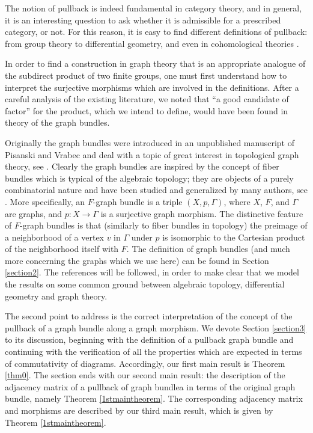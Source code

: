 \documentclass{amsart}
\theoremstyle{definition}
\numberwithin{equation}{section}
\begin{document}
The notion of  pullback is indeed  fundamental  in category theory, and in general, it is an interesting question to ask whether it is admissible for a prescribed category, or not. For this reason, it is easy to find different definitions of pullback: from group theory to differential geometry, and even in cohomological theories \cite{stefano}.


In order to find a construction in graph theory that is an appropriate analogue of the subdirect product of two finite groups, one must first understand how to interpret the surjective morphisms which are involved in the definitions. After a careful analysis of the existing literature, we noted that ``a good candidate of factor'' for the product, which we intend to define, would have been found   in theory of the graph bundles. 


Originally the graph bundles were introduced in an unpublished manuscript of Pisanski and Vrabec and deal with a topic of great interest in topological graph theory, see \cite{kwak, kwakk, Pisanski}. Clearly the graph bundles are inspired by the concept of fiber bundles which is typical of the algebraic topology; they are objects of a purely combinatorial nature and have been studied and generalized by many authors, see \cite{tensore, larrion, lessico}. More specifically, an $F$-graph bundle is a triple $(X, p, \Gamma)$, where $X$, $F$, and $\Gamma$ are graphs, and $p: X \longrightarrow \Gamma$ is a surjective graph morphism. The distinctive feature of $F$-graph bundles is that (similarly to fiber bundles in topology) the preimage of a neighborhood of a vertex $v$ in $\Gamma$ under $p$ is isomorphic to the Cartesian product of the neighborhood itself with $F$. The definition of graph bundles (and much more concerning the graphs which we use here) can be found in Section \ref{section2}. The references  \cite{ttd, kos} will be followed, in order to make clear that we model the results on some common ground between algebraic topology, differential geometry and graph theory.


The second point to address is the correct interpretation of the concept of the pullback of a graph bundle along a graph morphism. We devote  Section \ref{section3} to its discussion, beginning with the definition of a pullback graph bundle and continuing with the verification of all the properties which are expected in terms of  commutativity of diagrams. Accordingly, our first  main result is Theorem \ref{thm0}. The section ends with  our second main result: the description of the adjacency matrix of a pullback of  graph bundlea in terms of the original graph bundle, namely Theorem \ref{1stmaintheorem}. The corresponding adjacency matrix  and   morphisms are described by our third main result, which is given by Theorem \ref{1stmaintheorem}.
\end{document}
